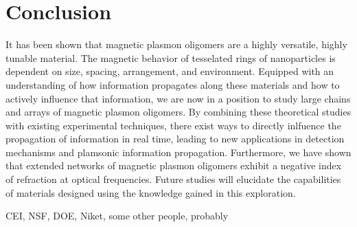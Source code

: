 \documentclass[journal=apchd5,manuscript=article]{achemso}
\begin{document}
\section{Conclusion}
It has been shown that magnetic plasmon oligomers are a highly versatile, highly tunable material. The magnetic behavior of tesselated rings of nanoparticles is dependent on size, spacing, arrangement, and environment. Equipped with an understanding of how information propagates along these materials and how to actively influence that information, we are now in a position to study large chains and arrays of magnetic plasmon oligomers. By combining these theoretical studies with existing experimental techniques, there exist ways to directly inlfuence the propagation of information in real time, leading to new applications in detection mechanisms and plamsonic information propagation. Furthermore, we have shown that extended networks of magnetic plasmon oligomers exhibit a negative index of refraction at optical frequencies. Future studies will elucidate the capabilities of materials designed using the knowledge gained in this exploration.

\begin{acknowledgement}
CEI, NSF, DOE, Niket, some other people, probably
\end{acknowledgement}


\end{document}
